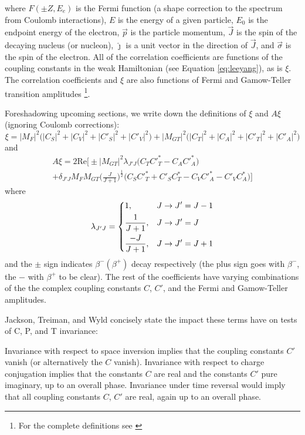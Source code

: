%
where $F(\pm Z, E_e)$ is the Fermi function (a shape correction to the spectrum
from Coulomb interactions), $E$ is the energy of a given particle, $E_0$ is the endpoint
energy of the electron, $\vec{p}$ is the particle momentum, $\vec{J}$ is the spin of the
decaying nucleus (or nucleon), $\hat{\jmath}$ is a unit vector in the direction of $\vec{J}$,
and $\vec{\sigma}$ is the spin of the electron. All of the correlation coefficients
are functions of the coupling constants in the weak Hamiltonian (see Equation \ref{eq:leeyang}),
as is $\xi$. The correlation coefficients and $\xi$ are also functions of Fermi and Gamow-Teller
transition amplitudes \footnote{For the complete definitions see \cite{jackson1957a,jackson1957b,ebel1957}}.

Foreshadowing upcoming sections, we write down the definitions of $\xi$ and $A\xi$ (ignoring Coulomb
corrections):
%
\begin{equation}
  \xi = |M_F|^2\big(|C_S|^2+|C_V|^2+|C'_S|^2+|C'_V|^2\big)+|M_{GT}|^2\big(|C_T|^2+|C_A|^2+|C'_T|^2+|C'_A|^2\big)
  \label{eq:xi}
\end{equation}
%
and
\begin{multline}
  A\xi = 2\mathrm{Re}\bigg[\pm |M_{GT}|^2 \lambda_{J'J}\big(C_TC'^*_T-C_AC'^*_A \big) \\
    + \delta_{J'J}M_FM_{GT}\bigg( \frac{J}{J+1} \bigg)^{\frac{1}{2}}\big(C_SC'^*_T+C'_SC^*_T -C_VC'^*_A-C'_VC^*_A \big) \bigg]
  \label{eq:XiA}
\end{multline}
where
\begin{equation}
\lambda_{J'J} =
\begin{dcases}
  1, & J\rightarrow J'=J-1 \\
  \frac{1}{J+1}, &  J\rightarrow J'=J \\
  \frac{-J}{J+1}, &  J\rightarrow J'=J+1 \\
\end{dcases}
\end{equation}
and the $\pm$ sign indicates $\beta^-(\beta^+)$ decay respectively (the plus sign goes with
$\beta^-$, the $-$ with $\beta^+$ to be clear).
The rest of the coefficients have varying combinations of the the complex coupling
constants $C$, $C'$, and the Fermi and
Gamow-Teller amplitudes.

Jackson, Treiman, and Wyld concisely state the impact these terms have on tests of C, P, and
T invariance:
\begin{displayquote}
Invariance with respect to space inversion implies that the coupling constants $C'$
vanish (or alternatively the $C$ vanish). Invariance with respect to charge
conjugation implies that the constants $C$ are real and the constants $C'$
pure imaginary, up to an overall phase. Invariance under time reversal
would imply that all coupling constants $C$, $C'$ are real, again up to an
overall phase.
\end{displayquote}

